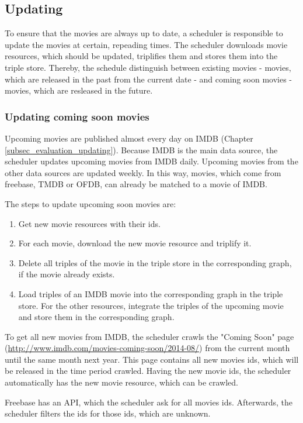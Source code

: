 \subsection{Updating}
\label{subsec_method_updating}

To ensure that the movies are always up to date, a scheduler is responsible to update the movies at certain, repeading times.
The scheduler downloads movie resources, which should be updated, triplifies them and stores them into the triple store.
Thereby, the schedule distinguish between existing movies - movies, which are released in the past from the current date - and coming soon movies - movies, which are resleased in the future.

\subsubsection{Updating coming soon movies}
Upcoming movies are published almost every day on IMDB (Chapter \ref{subsec_evaluation_updating}).
Because IMDB is the main data source, the scheduler updates upcoming movies from IMDB daily.
Upcoming movies from the other data sources are updated weekly.
In this way, movies, which come from freebase, TMDB or OFDB, can already be matched to a movie of IMDB.

The steps to update upcoming soon movies are:
\begin {enumerate}
	\item Get new movie resources with their ids.
	\item For each movie, download the new movie resource and triplify it.
	\item Delete all triples of the movie in the triple store in the corresponding graph, if the movie already exists.
	\item Load triples of an IMDB movie into the corresponding graph in the triple store. For the other resources, integrate  the triples of the upcoming movie and store them in the corresponding graph.
\end{enumerate}

To get all new movies from IMDB, the scheduler crawls the "Coming Soon" page (\url{http://www.imdb.com/movies-coming-soon/2014-08/}) from the current month until the same month next year.
This page contains all new movies ids, which will be released in the time period crawled.
Having the new movie ids, the scheduler automatically has the new movie resource, which can be crawled.

Freebase has an API, which the scheduler ask for all movies ids.
Afterwards, the scheduler filters the ids for those ids, which are unknown.

